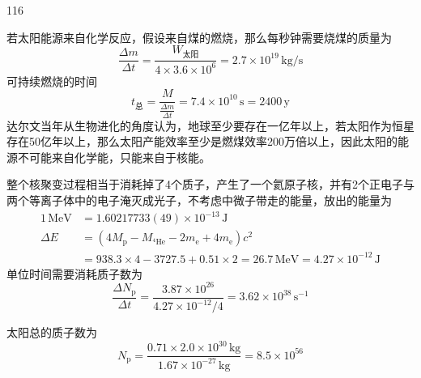 \begin{solution}{116}
\begin{subsolution}
\begin{subsubsolution}
            若太阳能源来自化学反应，假设来自煤的燃烧，那么每秒钟需要烧煤的质量为
            \begin{equation}
                \frac{\Delta m}{\Delta t} = \frac{W_{\text{太阳}}}{4 \times 3.6 \times 10^{6}} = 2.7 \times 10^{19} \,\mathrm{kg/s}
            \end{equation}
            可持续燃烧的时间
            \begin{equation}
                t_{\text{总}} = \frac{M}{\frac{\Delta m}{\Delta t}} = 7.4 \times 10^{10} \,\mathrm{s} = 2400 \,\mathrm{y}
                \label{eq:19.s116}
            \end{equation}
            达尔文当年从生物进化的角度认为，地球至少要存在一亿年以上，若太阳作为恒星存在50亿年以上，那么太阳产能效率至少是燃煤效率200万倍以上，因此太阳的能源不可能来自化学能，只能来自于核能。
        \end{subsubsolution}
    \end{subsolution}
    \begin{subsolution}
        \begin{subsubsolution}
            整个核聚变过程相当于消耗掉了4个质子，产生了一个氦原子核，并有2个正电子与两个等离子体中的电子淹灭成光子，不考虑中微子带走的能量，放出的能量为
            \begin{equation}
                \begin{aligned}
                    1 \,\mathrm{MeV} &= 1.60217733(49) \times 10^{-13} \,\mathrm{J} \\
                    \Delta E &= (4 M_{\mathrm{p}} - M_{^{4}\mathrm{He}} - 2 m_{\mathrm{e}} + 4 m_{\mathrm{e}}) c^{2} \\
                    &= 938.3 \times 4 - 3727.5 + 0.51 \times 2 = 26.7 \,\mathrm{MeV} = 4.27 \times 10^{-12} \,\mathrm{J}
                \end{aligned}
                \label{eq:20.s116}
            \end{equation}
            单位时间需要消耗质子数为
            \begin{equation}
                \frac{\Delta N_{\mathrm{p}}}{\Delta t} = \frac{3.87 \times 10^{26}}{4.27 \times 10^{-12} / 4} = 3.62 \times 10^{38} \,\mathrm{s^{-1}}
                \label{eq:21.s116}
            \end{equation}
        \end{subsubsolution}
        \begin{subsubsolution}
            太阳总的质子数为
            \begin{equation}
                N_{\mathrm{p}} = \frac{0.71 \times 2.0 \times 10^{30} \,\mathrm{kg}}{1.67 \times 10^{-27} \,\mathrm{kg}} = 8.5 \times 10^{56}

\end{equation}
\end{subsubsolution}
\end{subsolution}
\end{solution}
